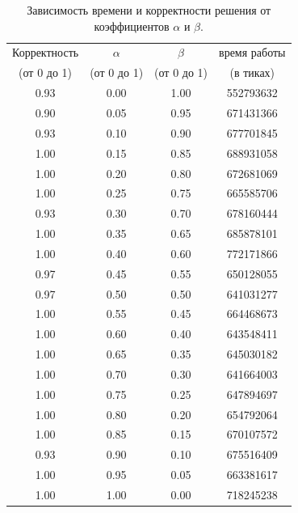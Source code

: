 \documentclass[12pt, a4paper]{report}
\begin{document}
    \begin{table}[ht!]
    	\centering
    	\begin{tabular}{ | c | c | c | c | }
    		\hline
    		Корректность   &  $\alpha$   &  $\beta$  &  время работы \\
    		(от 0 до 1) & (от 0 до 1) & (от 0 до 1) & (в тиках) \\ \hline  
    		0.93 & 0.00 & 1.00 &  552793632 \\
    		0.90 & 0.05 & 0.95 &  671431366 \\
    		0.93 & 0.10 & 0.90 &  677701845 \\
    		1.00 & 0.15 & 0.85 &  688931058 \\
    		1.00 & 0.20 & 0.80 &  672681069 \\
    		1.00 & 0.25 & 0.75 &  665585706 \\
    		0.93 & 0.30 & 0.70 &  678160444 \\
    		1.00 & 0.35 & 0.65 &  685878101 \\
    		1.00 & 0.40 & 0.60 &  772171866 \\
    		0.97 & 0.45 & 0.55 &  650128055 \\
    		0.97 & 0.50 & 0.50 &  641031277 \\
    		1.00 & 0.55 & 0.45 &  664468673 \\
    		1.00 & 0.60 & 0.40 &  643548411 \\
    		1.00 & 0.65 & 0.35 &  645030182 \\
    		1.00 & 0.70 & 0.30 &  641664003 \\
    		1.00 & 0.75 & 0.25 &  647894697 \\
    		1.00 & 0.80 & 0.20 &  654792064 \\
    		1.00 & 0.85 & 0.15 &  670107572 \\
    		0.93 & 0.90 & 0.10 &  675516409 \\
    		1.00 & 0.95 & 0.05 &  663381617 \\
    		1.00 & 1.00 & 0.00 &  718245238 \\
    		\hline
    	\end{tabular}
    	\label{tab:alpha_beta}
    	\caption{Зависимость времени и корректности решения от коэффициентов $\alpha$ и $\beta$.}
    \end{table} 
    
    \newpage  
    
\end{document}
